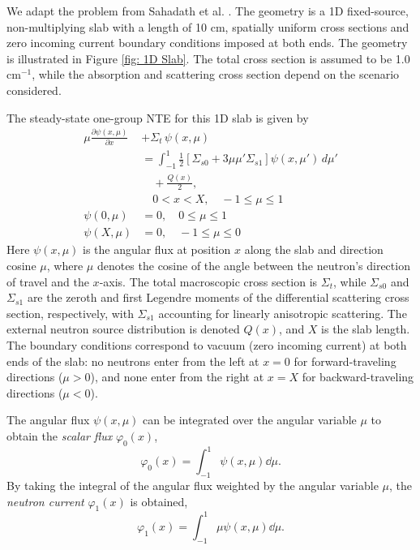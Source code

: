 \documentclass[%
 reprint,
 amsmath,amssymb,
 aps,
]{revtex4-1}
\begin{document}
We adapt the problem from Sahadath et al. \cite{sahadath2026characterization}. The geometry is a 1D fixed-source, non-multiplying slab with a
length of 10 cm, spatially uniform cross sections and zero incoming current boundary conditions imposed at both ends. The geometry is illustrated
in Figure \ref{fig: 1D Slab}. The total cross section is assumed to be 1.0 cm$^{-1}$, while the absorption and scattering
cross section depend on the scenario considered.

The steady-state one-group NTE for this 1D slab is given by
\begin{align}
\mu \frac{\partial \psi(x, \mu)}{\partial x}
&+ \Sigma_t \, \psi(x, \mu) \nonumber \\
&= \int_{-1}^{1} \tfrac{1}{2} \left[ \Sigma_{s0} + 3 \mu \mu' \Sigma_{s1} \right]
  \psi(x, \mu') \, d\mu' \nonumber \\
&\quad + \frac{Q(x)}{2}, \nonumber \\
& \quad 0 < x < X, \quad -1 \leq \mu \leq 1 \nonumber \\
\psi(0, \mu) &= 0, \quad 0 \leq \mu \leq 1 \nonumber \\
\psi(X, \mu) &= 0, \quad -1 \leq \mu \leq 0 \label{eq: 1D NTE}
\end{align}
Here $\psi(x, \mu)$ is the angular flux at position $x$ along the slab and direction cosine $\mu$, where $\mu$ denotes the cosine of the angle
between the neutron's direction of travel and the $x$-axis. The total macroscopic cross section is $\Sigma_t$, while $\Sigma_{s0}$ and
$\Sigma_{s1}$ are the zeroth and first Legendre moments of the differential scattering cross section, respectively, with $\Sigma_{s1}$
accounting for linearly anisotropic scattering. The external neutron source distribution is denoted $Q(x)$, and $X$ is the slab length. The
boundary conditions correspond to vacuum (zero incoming current) at both ends of the slab: no neutrons enter from the left at $x = 0$ for
forward-traveling directions ($\mu > 0$), and none enter from the right at $x = X$ for backward-traveling directions ($\mu < 0$).

The angular flux $\psi(x, \mu)$ can be integrated over the angular variable $\mu$ to obtain the \textit{scalar flux} $\varphi_0(x)$,
\begin{equation} \label{eq: Scalar flux}
    \varphi_0(x) = \int_{-1}^1 \psi(x, \mu) \dd{\mu}.
\end{equation}
By taking the integral of the angular flux weighted by the angular variable $\mu$, the \textit{neutron current} $\varphi_1(x)$ is obtained,
\begin{equation} \label{eq: Scalar current}
    \varphi_1(x) = \int_{-1}^1 \mu \psi(x, \mu) \dd{\mu}.
\end{equation}
\end{document}
